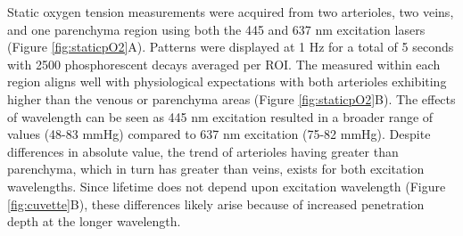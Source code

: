 Static oxygen tension measurements were acquired from two arterioles, two veins, and one parenchyma region using both the 445 and 637 nm excitation lasers (Figure \ref{fig:staticpO2}A). Patterns were displayed at 1 Hz for a total of 5 seconds with 2500 phosphorescent decays averaged per ROI. The measured  within each region aligns well with physiological expectations with both arterioles exhibiting higher  than the venous or parenchyma areas (Figure \ref{fig:staticpO2}B). The effects of wavelength can be seen as 445 nm excitation resulted in a broader range of  values (48-83 mmHg) compared to 637 nm excitation (75-82 mmHg). Despite differences in absolute value, the trend of arterioles having greater  than parenchyma, which in turn has greater  than veins, exists for both excitation wavelengths. Since lifetime does not depend upon excitation wavelength (Figure \ref{fig:cuvette}B), these differences likely arise because of increased penetration depth at the longer wavelength.

